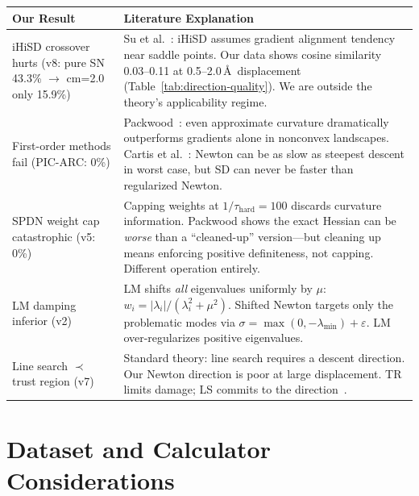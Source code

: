 \documentclass[11pt,a4paper]{article}
\theoremstyle{definition}
\begin{document}
\begin{longtable}{p{}p{}}
\toprule
\textbf{Our Result} & \textbf{Literature Explanation} \\
\midrule
\endhead

iHiSD crossover hurts (v8: pure SN 43.3\% $\to$ cm=2.0 only 15.9\%)
& Su et al.~\citep{ihisd}: iHiSD assumes gradient alignment tendency near
  saddle points.  Our data shows cosine similarity 0.03--0.11 at
  0.5--2.0\,\AA\ displacement (Table~\ref{tab:direction-quality}).
  We are outside the theory's applicability regime. \\

First-order methods fail (PIC-ARC: 0\%)
& Packwood~\citep{packwood2018}: even approximate curvature dramatically
  outperforms gradients alone in nonconvex landscapes.
  Cartis et al.~\citep{cgt-complexity}: Newton can be as slow as steepest
  descent in worst case, but SD can never be faster than regularized Newton. \\

SPDN weight cap catastrophic (v5: 0\%)
& Capping weights at $1/\tau_\text{hard} = 100$ discards curvature
  information.  Packwood shows the exact Hessian can be \emph{worse} than a
  ``cleaned-up'' version---but cleaning up means enforcing positive
  definiteness, not capping.  Different operation entirely. \\

LM damping inferior (v2)
& LM shifts \emph{all} eigenvalues uniformly by $\mu$:
  $w_i = |\lambda_i|/(\lambda_i^2+\mu^2)$.  Shifted Newton targets
  only the problematic modes via $\sigma = \max(0,-\lambda_\text{min})+\varepsilon$.
  LM over-regularizes positive eigenvalues. \\

Line search $\prec$ trust region (v7)
& Standard theory: line search requires a descent direction.  Our Newton
  direction is poor at large displacement.  TR limits damage; LS commits to
  the direction~\citep{schlegel2011,cgt-optimal}. \\

\bottomrule
\end{longtable}

\section{Dataset and Calculator Considerations}
\label{sec:dataset}
\end{document}
